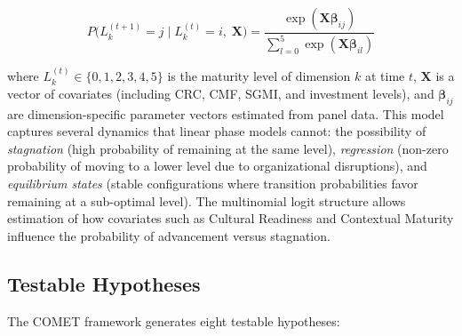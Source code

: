 \documentclass[12pt,a4paper]{article}
\begin{document}
\begin{equation}
P\bigl(L_k^{(t+1)} = j \mid L_k^{(t)} = i,\; \mathbf{X}\bigr) = \frac{\exp(\mathbf{X}\boldsymbol{\beta}_{ij})}{\sum_{l=0}^{5} \exp(\mathbf{X}\boldsymbol{\beta}_{il})}
\label{eq:markov}
\end{equation}

\noindent where $L_k^{(t)} \in \{0, 1, 2, 3, 4, 5\}$ is the maturity level of dimension $k$ at time $t$, $\mathbf{X}$ is a vector of covariates (including CRC, CMF, SGMI, and investment levels), and $\boldsymbol{\beta}_{ij}$ are dimension-specific parameter vectors estimated from panel data. This model captures several dynamics that linear phase models cannot: the possibility of \textit{stagnation} (high probability of remaining at the same level), \textit{regression} (non-zero probability of moving to a lower level due to organizational disruptions), and \textit{equilibrium states} (stable configurations where transition probabilities favor remaining at a sub-optimal level). The multinomial logit structure allows estimation of how covariates such as Cultural Readiness and Contextual Maturity influence the probability of advancement versus stagnation.

\subsection{Testable Hypotheses}

The COMET framework generates eight testable hypotheses:
\end{document}
